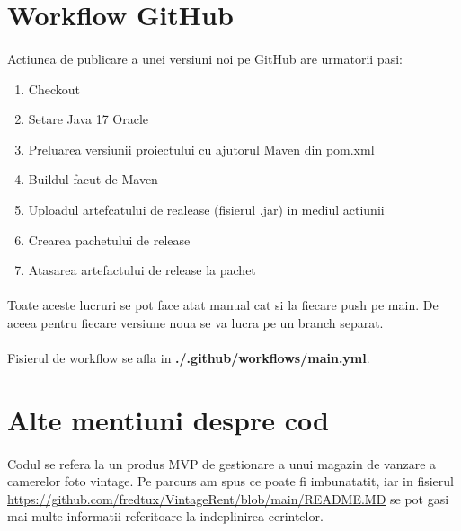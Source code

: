 \documentclass[oneside]{article}
\begin{document}
\section[Workflow GitHub]{Workflow GitHub}
\paragraph{} Actiunea de publicare a unei versiuni noi pe GitHub are urmatorii pasi:
\begin{enumerate}
    \item Checkout
    \item Setare Java 17 Oracle
    \item Preluarea versiunii proiectului cu ajutorul Maven din pom.xml
    \item Buildul facut de Maven
    \item Uploadul artefcatului de realease (fisierul .jar) in mediul actiunii
    \item Crearea pachetului de release
    \item Atasarea artefactului de release la pachet
\end{enumerate}

\paragraph{} Toate aceste lucruri se pot face atat manual cat si la fiecare push pe main. De aceea pentru fiecare versiune noua se va lucra pe un branch separat.

\paragraph{} Fisierul de workflow se afla in \textbf{./.github/workflows/main.yml}.

\section[Alte mentiuni despre cod]{Alte mentiuni despre cod}
\paragraph{} Codul se refera la un produs MVP de gestionare a unui magazin de vanzare a camerelor foto vintage. Pe parcurs am spus ce poate fi imbunatatit, iar in fisierul {\color{blue}\url{https://github.com/fredtux/VintageRent/blob/main/README.MD}} se pot gasi mai multe informatii referitoare la indeplinirea cerintelor.
\end{document}
